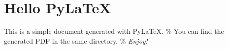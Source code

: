 \documentclass{article}%
\begin{document}
%
\normalsize%
\section{Hello PyLaTeX}%
\label{sec:HelloPyLaTeX}%
This is a simple document generated with PyLaTeX.%
\%
You can find the generated PDF in the same directory.%
\%
\textit{Enjoy!}

%
\end{document}
